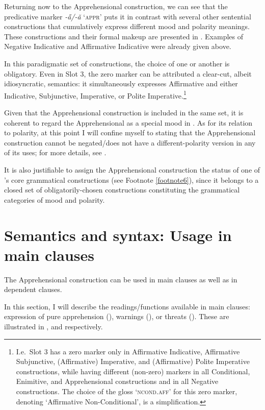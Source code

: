 \documentclass[output=paper,colorlinks,citecolor=brown]{langscibook}
\begin{document}
 Returning now to the Apprehensional construction, we can see that the predicative marker \textit{-a̋/-ǎ} `\textsc{appr}' puts it in contrast with several other sentential constructions that cumulatively express different mood and polarity meanings. These constructions and their formal makeup are presented in . Examples of Negative Indicative  and Affirmative Indicative  were already given above.


In this paradigmatic set of constructions, the choice of one or another is obligatory. Even in Slot 3, the zero marker can be attributed a clear-cut, albeit idiosyncratic, semantics: it simultaneously expresses Affirmative and either Indicative, Subjunctive, Imperative, or Polite Imperative.\footnote{I.e.\ Slot 3 has a zero marker only in Affirmative Indicative, Affirmative Subjunctive, (Affirmative) Imperative, and (Affirmative) Polite Imperative constructions, while having different (non-zero) markers in all Conditional, Enimitive, and Apprehensional constructions and in all Negative constructions. The choice of the gloss `\textsc{ncond.aff}' for this zero marker, denoting `Affirmative Non-Conditional', is a simplification.\label{footnote9}}

Given that the Apprehensional construction is included in the same set, it is coherent to regard the Apprehensional as a special mood in . As for its relation to polarity, at this point I will confine myself to stating that the Apprehensional construction cannot be negated\slash does not have a different-polarity version in any of its uses; for more details, see .

It is also justifiable to assign the Apprehensional construction the status of one of 's core grammatical constructions (see Footnote \ref{footnote6}), since it belongs to a closed set of obligatorily-chosen constructions constituting the grammatical categories of mood and polarity.



\section{Semantics and syntax: Usage in main clauses}
\label{sec:fedotov:synsemmain}

The Apprehensional construction can be used in main clauses as well as in dependent clauses.

In this section, I will describe the readings\slash functions available in main clauses: expression of pure apprehension (), warnings (), or threats (). These are illustrated in ,  and  respectively.
\end{document}
